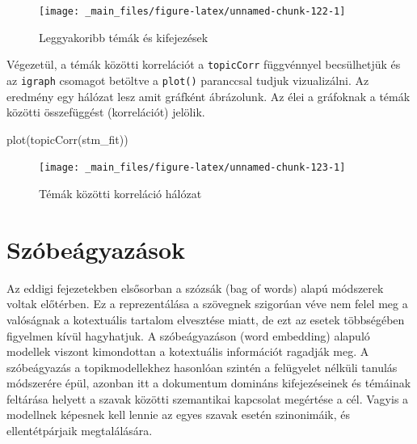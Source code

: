 \documentclass[
]{book}
\newenvironment{Shaded}{\begin{snugshade}}{\end{snugshade}}
\newcommand{\FunctionTok}[1]{\textcolor[rgb]{0.00,0.00,0.00}{#1}}
\newcommand{\NormalTok}[1]{#1}
\begin{document}
\begin{figure}

{\centering \texttt{[image: \_main\_files/figure-latex/unnamed-chunk-122-1]} 

}

\caption{Leggyakoribb témák és kifejezések}\label{fig:unnamed-chunk-122}
\end{figure}

Végezetül, a témák közötti korrelációt a \texttt{topicCorr} függvénnyel
becsülhetjük és az \texttt{igraph} csomagot betöltve a \texttt{plot()}
paranccsal tudjuk vizualizálni. Az eredmény egy hálózat lesz amit
gráfként ábrázolunk. Az élei a gráfoknak a témák közötti összefüggést
(korrelációt) jelölik.

\begin{Shaded}
\begin{Highlighting}[]

\FunctionTok{plot}\NormalTok{(}\FunctionTok{topicCorr}\NormalTok{(stm\_fit))}
\end{Highlighting}
\end{Shaded}

\begin{figure}

{\centering \texttt{[image: \_main\_files/figure-latex/unnamed-chunk-123-1]} 

}

\caption{Témák közötti korreláció hálózat}\label{fig:unnamed-chunk-123}
\end{figure}

\hypertarget{szuxf3beuxe1gyazuxe1sok}{%
\chapter{Szóbeágyazások}\label{szuxf3beuxe1gyazuxe1sok}}

Az eddigi fejezetekben elsősorban a szózsák (bag of words) alapú
módszerek voltak előtérben. Ez a reprezentálása a szövegnek szigorúan
véve nem felel meg a valóságnak a kotextuális tartalom elvesztése miatt,
de ezt az esetek többségében figyelmen kívül hagyhatjuk. A
szóbeágyazáson (word embedding) alapuló modellek viszont kimondottan a
kotextuális információt ragadják meg. A szóbeágyazás a topikmodellekhez
hasonlóan szintén a felügyelet nélküli tanulás módszerére épül, azonban
itt a dokumentum domináns kifejezéseinek és témáinak feltárása helyett a
szavak közötti szemantikai kapcsolat megértése a cél. Vagyis a modellnek
képesnek kell lennie az egyes szavak esetén szinonimáik, és
ellentétpárjaik megtalálására.
\end{document}

